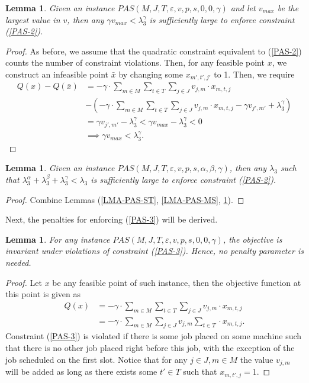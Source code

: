 \documentclass[12pt]{article}
\newtheorem{lemma}[theorem]{Lemma}
\begin{document}
\begin{lemma} \label{LMA-PAS-VAL}
Given an instance $PAS(M, J, T, \varepsilon, v, p, s, 0, 0, \gamma )$ and let  $v_{max}$ be the largest value in $v$, then any $ \gamma v_{max} < \lambda_3^{\gamma}$ is sufficiently large to enforce constraint (\ref{PAS-2}).
\end{lemma}
\begin{proof}
As before, we assume that the quadratic constraint equivalent to (\ref{PAS-2}) counts the number of constraint violations.
Then, for any feasible point $x$, we construct an infeasible point $\bar{x}$ by changing some $x_{m', t', j'}$ to 1.
Then, we require 
\begin{align*}
Q(x) - Q(\bar{x}) &= -\gamma \cdot \sum_{m \in M}  \sum_{t \in T}  \sum_{j \in J} v_{j,m} \cdot x_{m, t, j} \\
& - \left( -\gamma \cdot \sum_{m \in M}  \sum_{t \in T}  \sum_{j \in J} v_{j,m} \cdot x_{m, t, j} - \gamma v_{j', m'} +\lambda_3^{\gamma} \right)  \\
&= \gamma v_{j', m'} - \lambda_3^{\gamma} < \gamma  v_{max} - \lambda_3^{\gamma} < 0 \\  
&\implies  \gamma v_{max} < \lambda_3^{\gamma}.
\end{align*}

\end{proof}
\begin{lemma}
Given an instance  $PAS(M, J, T, \varepsilon, v, p, s, \alpha, \beta, \gamma )$, then any $ \lambda_3$ such that $\lambda_3^{\alpha} + \lambda_3^{\beta} + \lambda_3^{\gamma} < \lambda_3$ is sufficiently large to enforce constraint (\ref{PAS-2}).
\end{lemma}
\begin{proof}
Combine Lemmas (\ref{LMA-PAS-ST}, \ref{LMA-PAS-MS}, \ref{LMA-PAS-VAL}).
\end{proof}
Next, the penalties for enforcing (\ref{PAS-3}) will be derived.

\begin{lemma} \label{PAS-LMA-NG}
For any instance $PAS(M, J, T, \varepsilon, v, p, s, 0, 0, \gamma)$, the objective is invariant under violations of constraint (\ref{PAS-3}). Hence, no penalty parameter is needed.
\end{lemma}
\begin{proof}
Let $x$ be any feasible point of such instance, then the objective function at this point is given as
\begin{align*}
Q(x) &= -\gamma \cdot \sum_{m \in M}  \sum_{t \in T}  \sum_{j \in J} v_{j,m} \cdot x_{m, t, j} \\
&=  -\gamma \cdot \sum_{m \in M} \sum_{j \in J} v_{j,m}  \sum_{t \in T}   \cdot x_{m, t, j}.
\end{align*}
Constraint (\ref{PAS-3}) is violated if there is some job placed on some machine such that there is no other job placed right before this job, with the exception of the job scheduled on the first slot.
Notice that for any $j \in J, m \in M$ the value $v_{j,m}$ will be added as long as there exists some $t' \in T$ such that $x_{m, t', j} = 1$.
\end{proof}
\end{document}
